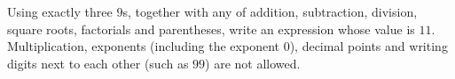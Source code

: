 Using exactly three $9$s, together with any of addition, subtraction, division, square roots, factorials and parentheses, write an expression whose value is $11$. Multiplication, exponents (including the exponent $0$), decimal points and writing digits next to each other (such as $99$) are not allowed.
